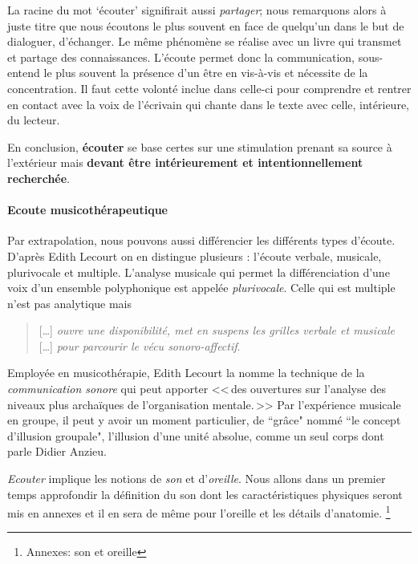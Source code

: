   La racine du mot `écouter' signifirait aussi \emph{partager}; nous
  remarquons alors à juste titre que nous écoutons le plus souvent en
  face de quelqu'un dans le but de dialoguer, d'échanger. Le même
  phénomène se réalise avec un livre qui transmet et partage des
  connaissances. L'écoute permet donc la communication, sous-entend le
  plus souvent la présence d'un être en vis-à-vis et nécessite de la
  concentration. Il faut cette volonté inclue dans celle-ci  pour
  comprendre et rentrer en contact avec la voix de  l'écrivain qui
  chante dans le texte avec celle, intérieure, du lecteur.

  
En conclusion, \textbf{écouter} se base certes sur une stimulation prenant sa source à 
l'extérieur mais \textbf{devant être intérieurement et  intentionnellement
	recherchée}.




      \paragraph{Ecoute musicothérapeutique}
      

Par extrapolation, nous pouvons aussi différencier les différents types d'écoute. D'après Edith Lecourt \autocite[ch. 10 <<\,De l'écoute verbale à l'écoute musicale\,>>, p. 182.]{lecourt:decouvrir}
 on en distingue plusieurs : l'écoute verbale, musicale, plurivocale et multiple.
 L'analyse musicale qui permet la différenciation d'une voix d'un ensemble polyphonique est appelée \emph{plurivocale}. Celle qui est multiple n'est pas analytique  mais 
 \begin{quote}
 	 [\ldots] \textit{ouvre une disponibilité, met en suspens les grilles verbale et musicale} [\ldots] \emph{pour parcourir le vécu sonoro-affectif}\autocite[p. 183]{lecourt:decouvrir}.
 \end{quote}
 Employée en musicothérapie, Edith Lecourt la nomme la technique de la  \emph{communication sonore} qui peut apporter 
 <<\,des ouvertures sur l'analyse des niveaux plus archaïques de l'organisation mentale.\,>>\autocite[p. 154]{lecourt:decouvrir}	
 Par l'expérience musicale en groupe, il peut y avoir un moment particulier, de ``grâce"  nommé ``le concept d'illusion groupale", l'illusion d'une unité absolue, comme un seul corps\autocite{anzieu:groupal} dont parle Didier Anzieu.


 
\emph{Ecouter} implique les notions de \emph{son} et
d'\emph{oreille}. Nous allons dans un premier temps approfondir  la
définition du son dont les caractéristiques physiques seront mis en
annexes et il en sera de même pour l'oreille et les détails
d'anatomie. \footnote{Annexes: son et oreille}

